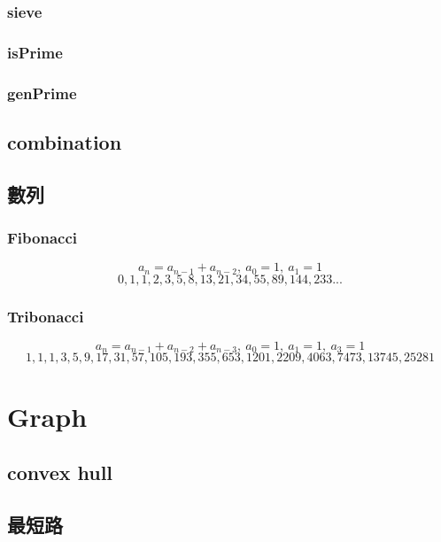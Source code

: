 \subsubsection{sieve}


\subsubsection{isPrime}


\subsubsection{genPrime}


\subsection{combination}


\subsection{數列}
\subsubsection{Fibonacci}
\[a_{n} = a_{n-1} + a_{n-2},\ a_0 = 1,\ a_1 = 1\]
\[0, 1, 1, 2, 3, 5, 8, 13, 21, 34, 55, 89, 144, 233...\]

\subsubsection{Tribonacci}
\[a_{n} = a_{n-1} + a_{n-2} + a_{n-3},\ a_0 = 1,\ a_1 = 1,\ a_3 = 1\]
\[1, 1, 1, 3, 5, 9, 17, 31, 57, 105, 193, 355, 653, 1201, 2209, 4063, 7473, 13745, 25281\]

\section{Graph}

\subsection{convex hull}


\subsection{最短路}
